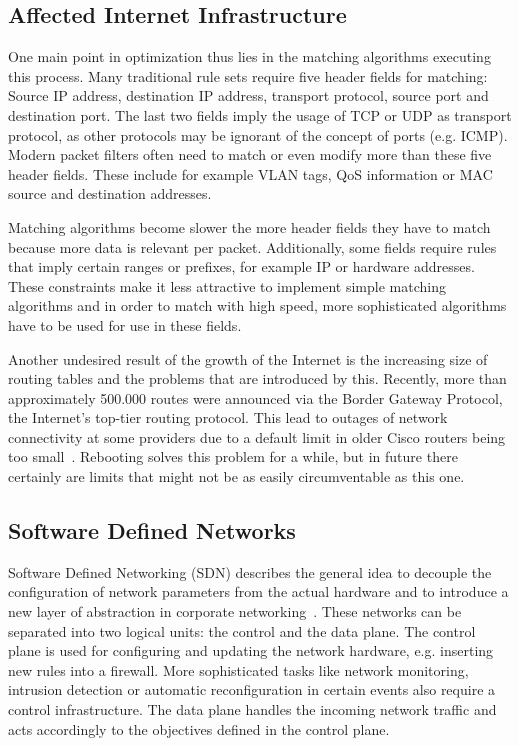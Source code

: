 \documentclass[a4paper,
		12pt,
		parskip=full,
		titlepage
		]{scrartcl}
\begin{document}
\subsection{Affected Internet Infrastructure}
One main point in optimization thus lies in the matching algorithms executing this process.
Many traditional rule sets require five header fields for matching: Source 
IP address, destination IP address, transport protocol, source port and destination port.
The last two fields imply the usage of TCP or UDP as transport protocol, 
as other protocols may be ignorant of the concept of ports (e.g. ICMP).
Modern packet filters often need to match or even modify more than these five header fields.
These include for example VLAN tags, QoS information or MAC source and destination addresses.

Matching algorithms become slower the more header fields they have to match because more data is relevant per packet.
Additionally, some fields require rules that imply certain ranges or prefixes, for example IP or hardware addresses.
These constraints make it less attractive to implement simple matching algorithms and in order to match with high speed, more sophisticated
algorithms have to be used for use in these fields.

Another undesired result of the growth of the Internet is the increasing size of routing tables and the problems that are introduced by this.
Recently, more than approximately 500.000 routes were announced via the Border Gateway Protocol, the Internet's top-tier routing protocol.
This lead to outages of network connectivity at some providers due to a default limit in older Cisco routers being too small~\cite{outage}.
Rebooting solves this problem for a while, but in future there certainly are limits that might not be as easily circumventable as this one.

\subsection{Software Defined Networks}
\label{sec:SDN}
Software Defined Networking (SDN) describes the general idea to decouple 
the configuration of network parameters from the actual hardware and to 
introduce a new layer of abstraction in corporate networking~\cite{onf_whitepaper}.
These networks can be separated into two logical units: the control and the data plane.
The control plane is used for configuring and updating the network hardware, e.g. inserting new rules into a firewall.
More sophisticated tasks like network monitoring, intrusion detection or 
automatic reconfiguration in certain events also require a control infrastructure.
The data plane handles the incoming network traffic and acts accordingly to the objectives defined in the control plane.
\end{document}
